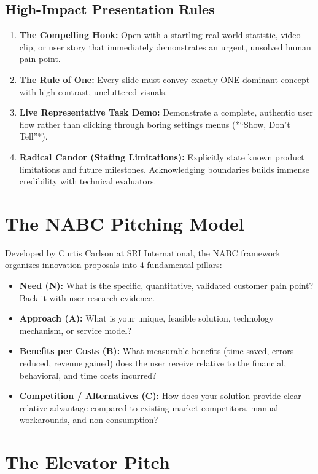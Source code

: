 \subsection{High-Impact Presentation Rules}
\begin{enumerate}[leftmargin=1.2em, itemsep=3pt]
    \item \textbf{The Compelling Hook:} Open with a startling real-world statistic, video clip, or user story that immediately demonstrates an urgent, unsolved human pain point.
    \item \textbf{The Rule of One:} Every slide must convey exactly ONE dominant concept with high-contrast, uncluttered visuals.
    \item \textbf{Live Representative Task Demo:} Demonstrate a complete, authentic user flow rather than clicking through boring settings menus (*``Show, Don't Tell''*).
    \item \textbf{Radical Candor (Stating Limitations):} Explicitly state known product limitations and future milestones. Acknowledging boundaries builds immense credibility with technical evaluators.
\end{enumerate}

\section{The NABC Pitching Model}

Developed by Curtis Carlson at SRI International, the NABC framework organizes innovation proposals into 4 fundamental pillars:
\begin{itemize}[leftmargin=1.2em, itemsep=3pt]
    \item \textbf{Need (N):} What is the specific, quantitative, validated customer pain point? Back it with user research evidence.
    \item \textbf{Approach (A):} What is your unique, feasible solution, technology mechanism, or service model?
    \item \textbf{Benefits per Costs (B):} What measurable benefits (time saved, errors reduced, revenue gained) does the user receive relative to the financial, behavioral, and time costs incurred?
    \item \textbf{Competition / Alternatives (C):} How does your solution provide clear relative advantage compared to existing market competitors, manual workarounds, and non-consumption?
\end{itemize}

\section{The Elevator Pitch}

